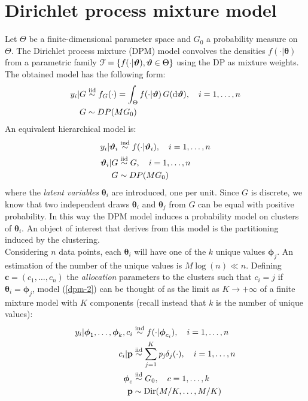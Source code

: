 \section{Dirichlet process mixture model}
Let $\Theta$ be a finite-dimensional parameter space and $G_0$ a probability measure on $\Theta$.
The Dirichlet process mixture (DPM) model convolves the densities $f(\cdot|\boldsymbol\theta)$ from a parametric family $\mathcal F = \{f(\cdot|\boldsymbol{\vartheta}), \boldsymbol{\vartheta} \in \Theta \}$ using the DP as mixture weights.
The obtained model has the following form:
\begin{equation}
	\begin{aligned}\label{dpm-1}
	y_i | G &\stackrel{\text{iid}}{\sim} f_G(\cdot) = \int_\Theta f(\cdot|\boldsymbol{\vartheta}) \, G(\mathrm d\boldsymbol{\vartheta}), \quad i=1,\dots,n \\
	G &\sim DP(M G_0)
	\end{aligned}
\end{equation}
An equivalent hierarchical model is:
\begin{equation}
	\begin{aligned}\label{dpm-2}
	y_i | \boldsymbol{\vartheta}_i &\stackrel{\text{ind}}{\sim} f(\cdot|\boldsymbol{\vartheta}_i), \quad i=1,\dots,n \\
	\boldsymbol{\vartheta}_i | G &\stackrel{\text{iid}}{\sim} G, \quad i=1,\dots,n \\ 
	G &\sim DP(M G_0)
	\end{aligned}
\end{equation}
where the \emph{latent variables} $\boldsymbol\theta_i$ are introduced, one per unit.
Since $G$ is discrete, we know that two independent draws $\boldsymbol\theta_i$ and $\boldsymbol\theta_j$ from $G$ can be equal with positive probability.
In this way the DPM model induces a probability model on clusters of $\boldsymbol\theta_i$.
An object of interest that derives from this model is the partitioning induced by the clustering. \\%
Considering $n$ data points, each $\boldsymbol\theta_i$ will have one of the $k$ unique values $\boldsymbol\phi_{j}$.
An estimation of the number of the unique values is $M\log(n) \ll n$.
Defining  $\boldsymbol c= (c_1,\dots,c_n)$ the \emph{allocation} parameters to the clusters such that $c_i = j$ if $\boldsymbol\theta_i = \boldsymbol\phi_j$, model (\ref{dpm-2}) can be thought of as the limit as $K \to +\infty$  of a finite mixture model with $K$ components (recall instead that $k$ is the number of unique values):
\begin{equation}
	\begin{aligned}\label{dpm-disc}
		y_{i}|\boldsymbol{\phi}_1,\dots,\boldsymbol{\phi}_k,c_{i} &\stackrel{\text{ind}}{\sim} f(\cdot|\boldsymbol\phi_{c_{i}}), \quad i=1,\dots,n \\
		c_{i}|\mathit{\mathbf{p}}&\stackrel{\text{iid}}{\sim} \sum_{j=1}^K\mathit{p_j} \delta_j(\cdot), \quad i=1,\dots,n \\
		\boldsymbol\phi_{c} & \stackrel{\text{iid}}{\sim} G_{0}, \quad c=1,\dots,k \\
		\mathbf{p} &\sim \operatorname{Dir}(M/K,\dots,M/K)
	\end{aligned}
\end{equation}
